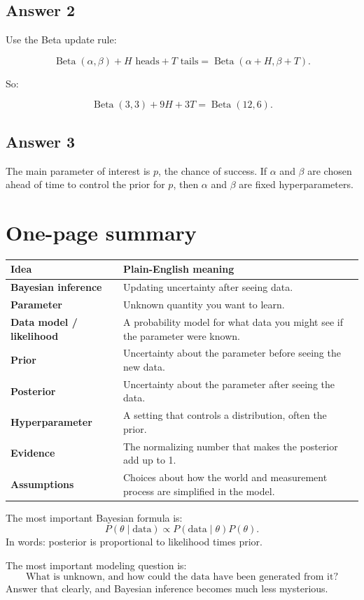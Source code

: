\documentclass[11pt]{article}
\newcommand{\data}{\text{data}}
\begin{document}
\subsection*{Answer 2}

Use the Beta update rule:

\[
\operatorname{Beta}(\alpha,\beta)+H\text{ heads}+T\text{ tails}
=\operatorname{Beta}(\alpha+H,\beta+T).
\]

So:

\[
\operatorname{Beta}(3,3)+9H+3T=\operatorname{Beta}(12,6).
\]

\subsection*{Answer 3}

The main parameter of interest is $p$, the chance of success. If $\alpha$ and $\beta$ are chosen ahead of time to control the prior for $p$, then $\alpha$ and $\beta$ are fixed hyperparameters.

\section{One-page summary}

\begin{center}
\begin{tabularx}{\textwidth}{>{\bfseries}p{} X}
\toprule
Idea & Plain-English meaning \\
\midrule
Bayesian inference & Updating uncertainty after seeing data. \\
Parameter & Unknown quantity you want to learn. \\
Data model / likelihood & A probability model for what data you might see if the parameter were known. \\
Prior & Uncertainty about the parameter before seeing the new data. \\
Posterior & Uncertainty about the parameter after seeing the data. \\
Hyperparameter & A setting that controls a distribution, often the prior. \\
Evidence & The normalizing number that makes the posterior add up to 1. \\
Assumptions & Choices about how the world and measurement process are simplified in the model. \\
\bottomrule
\end{tabularx}
\end{center}

\begin{bigidea}
The most important Bayesian formula is:
\[
P(\theta\mid\data)\propto P(\data\mid\theta)P(\theta).
\]
In words: posterior is proportional to likelihood times prior.
\end{bigidea}

\begin{bigidea}
The most important modeling question is:
\[
\text{What is unknown, and how could the data have been generated from it?}
\]
Answer that clearly, and Bayesian inference becomes much less mysterious.
\end{bigidea}
\end{document}
